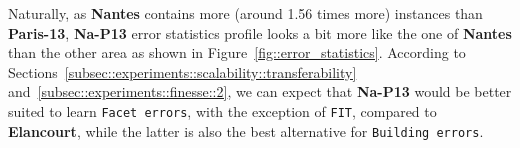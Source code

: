     \begin{figure}[htp]
        \centering
    \end{figure}

    Naturally, as \textbf{Nantes} contains more (around \num{1.56} times more) instances than \textbf{Paris-13}, \textbf{Na-P13} error statistics profile looks a bit more like the one of \textbf{Nantes} than the other area as shown in Figure~\ref{fig::error_statistics}.
    According to Sections~\ref{subsec::experiments::scalability::transferability} and~\ref{subsec::experiments::finesse::2}, we can expect that \textbf{Na-P13} would be better suited to learn \texttt{Facet errors}, with the exception of \texttt{FIT}, compared to \textbf{Elancourt}, while the latter is also the best alternative for \texttt{Building errors}.

